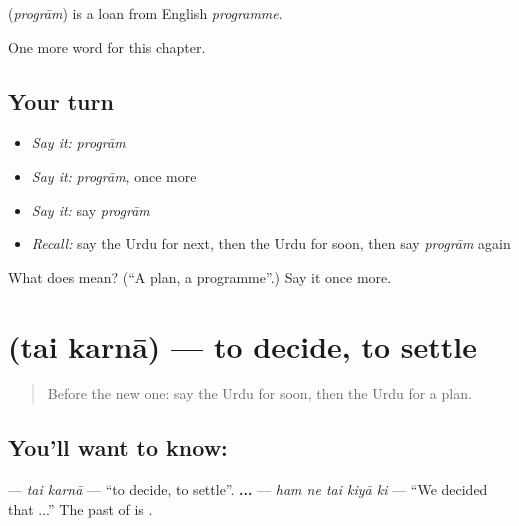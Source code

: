 \begin{cousinweb}
\textbf{} (\emph{progrām}) is a loan from English \emph{programme}.
\end{cousinweb}

\begin{grammarlens}[title={What you've built}]
One more word for this chapter.
\end{grammarlens}

\subsection*{Your turn}
\begin{itemize}
\raggedright
  \item \emph{Say it:} \emph{progrām}
  \item \emph{Say it:} \emph{progrām}, once more
  \item \emph{Say it:} say \emph{progrām}
  \item \emph{Recall:} say the Urdu for next, then the Urdu for soon, then say \emph{progrām} again
\end{itemize}

\begin{tcolorbox}[breakable,colback=teal!4,colframe=teal!35!black,title={Before you move on}]
What does  mean? (\textquotedblleft{}A plan, a programme\textquotedblright{}.) Say it once more.
\end{tcolorbox}
\section[\texorpdfstring{\ur{طے} \ur{کرنا} (tai karnā)}{طے کرنا (tai karnā)}]{  (tai karnā) — to decide, to settle}

\label{lesson:UR-C145-tai-karna}



\begin{quote}
Before the new one: say the Urdu for soon, then the Urdu for a plan.
\end{quote}

\subsection*{You'll want to know:  }
\textbf{ } — \emph{tai karnā} — \textquotedblleft{}to decide, to settle\textquotedblright{}. \textbf{     ...} — \emph{ham ne tai kiyā ki} — \textquotedblleft{}We decided that ...\textquotedblright{} The past of \textbf{} is \textbf{}.

